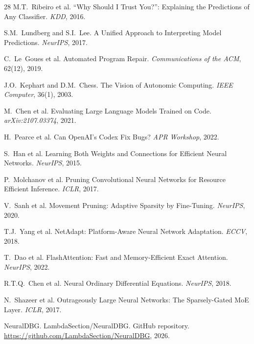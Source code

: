 \documentclass[11pt]{article}
\begin{document}
\begin{thebibliography}{28}
M.T.~Ribeiro et al.
\newblock ``Why Should I Trust You?'': Explaining the Predictions of Any Classifier.
\newblock \emph{KDD}, 2016.

S.M.~Lundberg and S.I.~Lee.
\newblock A Unified Approach to Interpreting Model Predictions.
\newblock \emph{NeurIPS}, 2017.

C.~Le~Goues et al.
\newblock Automated Program Repair.
\newblock \emph{Communications of the ACM}, 62(12), 2019.

J.O.~Kephart and D.M.~Chess.
\newblock The Vision of Autonomic Computing.
\newblock \emph{IEEE Computer}, 36(1), 2003.

M.~Chen et al.
\newblock Evaluating Large Language Models Trained on Code.
\newblock \emph{arXiv:2107.03374}, 2021.

H.~Pearce et al.
\newblock Can OpenAI's Codex Fix Bugs?
\newblock \emph{APR Workshop}, 2022.

S.~Han et al.
\newblock Learning Both Weights and Connections for Efficient Neural Networks.
\newblock \emph{NeurIPS}, 2015.

P.~Molchanov et al.
\newblock Pruning Convolutional Neural Networks for Resource Efficient Inference.
\newblock \emph{ICLR}, 2017.

V.~Sanh et al.
\newblock Movement Pruning: Adaptive Sparsity by Fine-Tuning.
\newblock \emph{NeurIPS}, 2020.

T.J.~Yang et al.
\newblock NetAdapt: Platform-Aware Neural Network Adaptation.
\newblock \emph{ECCV}, 2018.

T.~Dao et al.
\newblock FlashAttention: Fast and Memory-Efficient Exact Attention.
\newblock \emph{NeurIPS}, 2022.

R.T.Q.~Chen et al.
\newblock Neural Ordinary Differential Equations.
\newblock \emph{NeurIPS}, 2018.

N.~Shazeer et al.
\newblock Outrageously Large Neural Networks: The Sparsely-Gated MoE Layer.
\newblock \emph{ICLR}, 2017.

NeuralDBG.
\newblock LambdaSection/NeuralDBG. GitHub repository.
\newblock \url{https://github.com/LambdaSection/NeuralDBG}, 2026.

\end{thebibliography}
\end{document}
